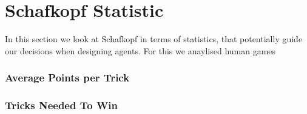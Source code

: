 \section{Schafkopf Statistic}
In this section we look at Schafkopf in terms of statistics, that potentially guide our decisions when designing
agents.
For this we anaylised human games
\subsubsection{Average Points per Trick}
\subsubsection{Tricks Needed To Win}
